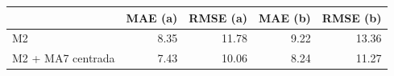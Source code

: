 \begin{tabular}{lrrrr}
\toprule
 & MAE (a) & RMSE (a) & MAE (b) & RMSE (b) \\
\midrule
M2 & 8.35 & 11.78 & 9.22 & 13.36 \\
M2 + MA7 centrada & 7.43 & 10.06 & 8.24 & 11.27 \\
\bottomrule
\end{tabular}
